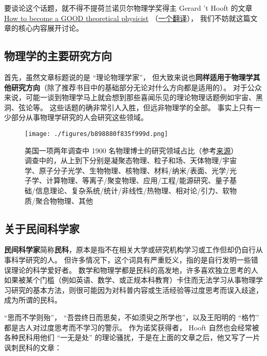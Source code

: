 
\begin{issues}
\issueDraft
\end{issues}

要谈论这个话题，就不得不提荷兰诺贝尔物理学奖得主 Gerard 't Hooft 的文章 \href{https://webspace.science.uu.nl/~hooft101/theorist.html}{How to become a GOOD theoretical physicist} （\href{https://xialab.pku.edu.cn/kytdyw1/zdylm.m.jsp?wbtreeid=1011&tstreeid=11956&_t_uid=2945&language=en&homepageuuid=BF649325C5584FC683CE0B601D21AC65&templateuuid=4CC182410BA14FF8B55ED726FB2087FB&producttype=0&_tmode_=99&tsitesapptype=zdylm}{一个翻译}）， 我们不妨就这篇文章的核心内容展开讨论。

\subsection{物理学的主要研究方向}
首先，虽然文章标题说的是 “理论物理学家”， 但大致来说也\textbf{同样适用于物理学其他研究方向}（除了推荐书目中的基础部分无论对什么方向都是适用的）。 对于公众来说，可能一谈到物理学马上就会想到那些喜闻乐见的理论物理话题例如宇宙、黑洞、弦论等。 这些话题的确非常引人入胜，但远非物理学的全部。 事实上只有一少部分从事物理学研究的人会研究这些领域。

\begin{figure}[ht]
\centering
\texttt{[image: ./figures/b898880f835f999d.png]}
\caption{美国一项两年调查中 1900 名物理博士的研究领域占比（参考\href{https://ww2.aip.org/statistics/trends-in-physics-phds}{来源}）调查中的，从上到下分别是凝聚态物理、粒子和场、天体物理/宇宙学、原子分子光学、生物物理、核物理、材料/纳米/表面、光学/光子学、计算物理、等离子/聚变物理、应用/工程/能源研究、量子基础/信息理论、复杂系统/统计/非线性/热物理、相对论/引力、软物质/聚合物物理、其他} \label{fig_SdyPhy_1}
\end{figure}

\subsection{关于民间科学家}
\textbf{民间科学家}简称\textbf{民科}，原本是指不在相关大学或研究机构学习或工作但却仍自行从事科学研究的人。 但许多情况下，这个词具有严重贬义，指的是自行发明一些错误理论的科学爱好者。 数学和物理学都是民科的高发地，许多喜欢独立思考的人如果被某个门槛（例如英语、数学、或正规本科教育）卡住而无法学习从事物理学习研究的基本方法，则很可能因为对科普内容或生活经验等过度思考而误入歧途，成为所谓的民科。

“思而不学则殆”， “吾尝终日而思矣，不如须臾之所学也”，以及王阳明的 “格竹” 都是古人对过度思考而不学习的警示。 作为诺奖获得者， Hooft 自然也会经常被各种民科用他们 “一无是处” 的理论骚扰，于是在上面的文章之后，他又写了一片讽刺民科的文章：

